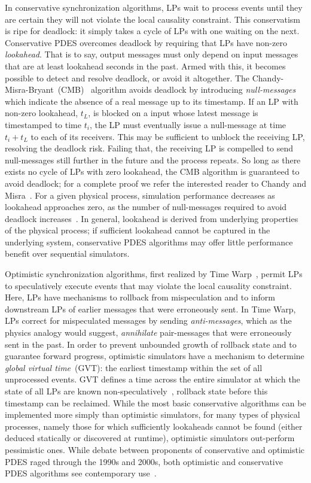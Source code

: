 In conservative synchronization algorithms, LPs wait to process events until
they are certain they will not violate the local causality constraint. This
conservatism is ripe for deadlock: it simply takes a cycle of LPs with one
waiting on the next. Conservative PDES overcomes deadlock by requiring that LPs have non-zero
\emph{lookahead}. That is to say, output messages must only depend on input
messages that are at least lookahead seconds in the past. Armed with this,
it becomes possible to detect and resolve deadlock, or avoid it altogether.
The Chandy-Misra-Bryant~(CMB)~\cite{NullMessagesBryant, NullMessagesChandy} algorithm avoids deadlock by introducing
\emph{null-messages} which indicate the absence of a real
message up to its timestamp. If an LP with non-zero lookahead, $t_{L}$, is blocked on a input whose latest
message is timestamped to time $t_{i}$, the LP must eventually issue a
null-message at time $t_{i} + t_{L}$ to each of its receivers. This may
be sufficient to unblock the receiving LP, resolving the deadlock risk. Failing that, the receiving LP is compelled to
send null-messages still further in the future and the process repeats.
So long as there exists no cycle of LPs with zero lookahead, the CMB algorithm
is guaranteed to avoid deadlock; for a complete proof we refer the interested reader to Chandy and Misra~\cite{NullMessagesChandy}.
For a given physical process, simulation performance decreases as lookahead approaches zero, as the number
of null-messages required to avoid deadlock increases~\cite{PDESFujimotoPrimer}.
In general, lookahead is derived from underlying properties of the
physical process; if sufficient lookahead cannot be
captured in the underlying system, conservative PDES algorithms may offer
little performance benefit over sequential simulators.

Optimistic synchronization algorithms, first realized by Time Warp~\cite{TimeWarp}, permit
LPs to speculatively execute events that may violate the local causality constraint.  Here, LPs have mechanisms to rollback from
mispeculation and to inform downstream LPs of earlier messages that were
erroneously sent. In Time Warp, LPs correct for mispeculated messages by
sending \emph{anti-messages}, which as the physics analogy would suggest,
\emph{annihilate} pair-messages that were erroneously sent
in the past. In order to prevent unbounded growth of rollback state and to
guarantee forward progress, optimistic simulators have a mechanism to determine
\emph{global virtual time}~(GVT): the earliest timestamp within the set of all
unprocessed events. GVT defines a time across the entire simulator at which
the state of all LPs are known non-speculatively~\cite{TimeWarp},
rollback state before this timestamp can be reclaimed. While the most
basic conservative algorithms can be implemented more simply than optimistic
simulators, for many types of physical processes, namely those for which
sufficiently lookaheads cannot be found (either deduced statically or discovered
at runtime), optimistic simulators out-perform pessimistic ones. While debate between proponents of conservative and optimistic PDES raged through
the 1990s and 2000s, both optimistic and conservative PDES algorithms see
contemporary use~\cite{PDESRetrospective}.

